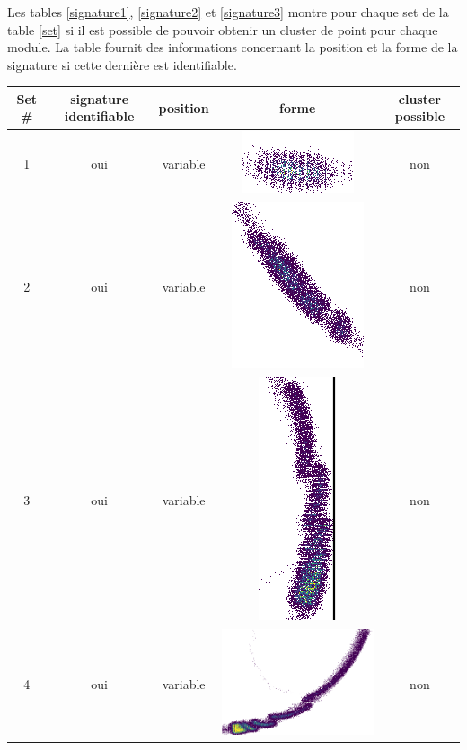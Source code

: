 Les tables \ref{signature1}, \ref{signature2} et \ref{signature3} montre pour chaque set de la table \ref{set} si il est possible de pouvoir obtenir un cluster de point pour chaque module. La table fournit  des informations concernant la position et la forme de la signature si cette dernière est identifiable.

\begin{table}[h]
\centering
\begin{tabular}{|c|c|c|c|c|}
\hline
Set \# & signature identifiable & position & forme & cluster possible\\
\hline
1 & oui & variable & \includegraphics[scale=0.2]{images/set1.png} & non \\
\hline
2 & oui & variable & \includegraphics[scale=0.2]{images/set2.png} & non \\
\hline
3 & oui & variable & \includegraphics[scale=0.2]{images/set3.png} & non \\
\hline
4 & oui & variable & \includegraphics[scale=0.2]{images/set4.png} & non \\

\end{tabular}
\end{table}
